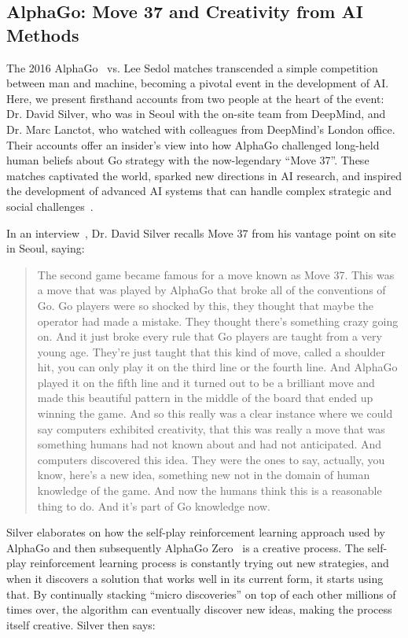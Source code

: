 \subsection{AlphaGo: Move 37 and Creativity from AI Methods~\citep{Silver2016, silverInterviewFridman2020}}
\label{sec:alphago}

The 2016 AlphaGo~\citep{Silver2016} vs. Lee Sedol matches transcended a simple competition between man and machine, becoming a pivotal event in the development of AI. Here, we present firsthand accounts from two people at the heart of the event: Dr. David Silver, who was in Seoul with the on-site team from DeepMind, and Dr. Marc Lanctot, who watched with colleagues from DeepMind's London office.
Their accounts offer an insider's view into how AlphaGo challenged long-held human beliefs about Go strategy with the now-legendary ``Move 37''. These matches captivated the world, sparked new directions in AI research, and inspired the development of advanced AI systems that can handle complex strategic and social challenges~\citep{Shin2023Go, leelazero, segler2018planning}.

In an interview~\citep{silverInterviewFridman2020}, Dr. David Silver recalls Move 37 from his vantage point on site in Seoul, saying:

\begin{quote}
    The second game became famous for a move known as Move 37. This was a move that was played by AlphaGo that broke all of the conventions of Go. Go players were so shocked by this, they thought that maybe the operator had made a mistake. They thought there's something crazy going on. And it just broke every rule that Go players are taught from a very young age. They're just taught that this kind of move, called a shoulder hit, you can only play it on the third line or the fourth line. And AlphaGo played it on the fifth line and it turned out to be a brilliant move and made this beautiful pattern in the middle of the board that ended up winning the game. And so this really was a clear instance where we could say computers exhibited creativity, that this was really a move that was something humans had not known about and had not anticipated. And computers discovered this idea. They were the ones to say, actually, you know, here's a new idea, something new not in the domain of human knowledge of the game. And now the humans think this is a reasonable thing to do. And it's part of Go knowledge now.
\end{quote}

Silver elaborates on how the self-play reinforcement learning approach used by AlphaGo and then subsequently AlphaGo Zero~\citep{silver2018general} is a creative process. The self-play reinforcement learning process is constantly trying out new strategies, and when it discovers a solution that works well in its current form, it starts using that. By continually stacking ``micro discoveries'' on top of each other millions of times over, the algorithm can eventually discover new ideas, making the process itself creative.
Silver then says:

